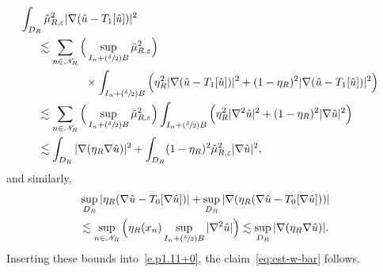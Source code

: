 \documentclass[JEP,XML,SOM,Unicode,published]{cedram}
\let\mathcal\mathscr
\newcommand{\Psfrac}[2]{(\sfrac{#1}{#2})}
\theoremstyle{plain}
\theoremstyle{definition}
\newcommand{\e}{\varepsilon}
\newcommand{\Nc}{\mathcal N}
\begin{document}
\begin{equation}
\label{eq:bnd-uhatT1}
\begin{aligned}
\lefteqn{\int_{D_R} \tilde \mu_{R,\e}^2|\nabla (\hat u-T_1[\hat u])|^2}\\
&\hspace*{5mm}\lesssim \sum_{n\in\Nc_R}\Big(\sup_{I_n+\Psfrac\delta2 B}\tilde\mu_{R,\e}^2\Big)\\
&\hspace*{2cm}\times\int_{I_n+\Psfrac\delta2 B}\Big( \eta_R^2 |\nabla (\hat u-T_1[\hat u])|^2+ (1-\eta_R)^2 |\nabla (\hat u-T_1[\hat u])|^2\Big)\\
&\hspace*{5mm}\lesssim \sum_{n\in\Nc_R}\Big(\sup_{I_n+\Psfrac\delta2 B}\tilde\mu_{R,\e}^2\Big)\int_{I_n+\Psfrac\delta2 B}\Big( \eta_R^2 |\nabla^2\hat u|^2+ (1-\eta_R)^2 |\nabla\hat u|^2\Big)\\
&\hspace*{5mm}\lesssim \int_{D_R} |\nabla(\eta_R\nabla \hat u)|^2+ \int_{D_R} (1-\eta_R)^2\tilde \mu_{R,\e}^2 |\nabla \hat u|^2,
\end{aligned}
\end{equation}
and similarly,
\begin{multline}\label{eq:bnd-ubarutil}
\sup_{D_R}|\eta_R(\nabla\hat u-T_0[\nabla\hat u])|+\sup_{D_R}|\nabla (\eta_R (\nabla\hat u-T_0[\nabla\hat u]))|\\
\lesssim \sup_{n\in\Nc_R}\Big(\eta_R(x_n)\sup_{I_n+\Psfrac\delta2 B}|\nabla^2\hat u|\Big)
\lesssim \sup_{D_R}|\nabla(\eta_R\nabla \hat u)|.
\end{multline}
Inserting these bounds into~\eqref{e.p1.11+0}, the claim~\eqref{eq:est-w-bar} follows.
\end{document}
